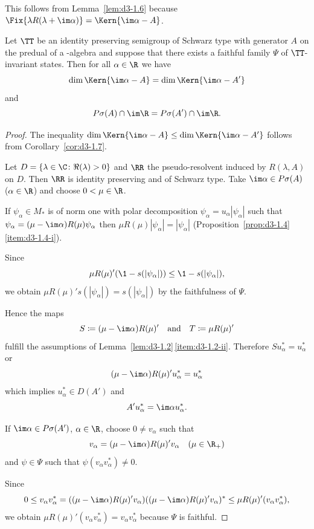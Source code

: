 This follows from Lemma~\ref{lem:d3-1.6} because $\Fix{\lambda R(\lambda+\im\alpha)} = \Kern{\im\alpha-A}$.
\begin{proposition}\label{prop:d3-1.8}
Let $\TT$ be an identity preserving semigroup of Schwarz type with generator $A$ on the predual of a \WA-algebra and suppose that there exists a faithful family $\Psi$ of\/ $\TT$-invariant states.
Then for all $\alpha \in \R$ we have
\[
\dim \Kern{\im\alpha - A} = \dim \Kern{\im\alpha - A'}
\]
and
\[
P\sigma(A) \cap \im\R = P{\sigma}(A') \cap \im\R .
\]
\end{proposition}
\begin{proof}
The inequality $\dim \Kern{\im\alpha - A} \leq \dim \Kern{\im\alpha - A'}$ follows from Corollary~\ref{cor:d3-1.7}.

Let $D = \{\lambda \in \C \colon \Re(\lambda) > 0\}$ and $\RR$ the pseudo-resolvent induced by $R(\lambda,A)$ on $D$.
Then $\RR$ is identity preserving and of Schwarz type.
Take $\im\alpha \in P\sigma(A)$ ($\alpha \in \R$) and choose $0 < \mu \in \R$.

If\/ $\psi_{\alpha} \in M_{*}$ is of norm one with polar decomposition $\psi_{\alpha} = u_{\alpha}|\psi_{\alpha}|$ such that $\psi_{\alpha} = (\mu - \im\alpha)R(\mu)\psi_{\alpha}$ then $\mu R(\mu)|\psi_{\alpha}| = |\psi_{\alpha}|$ (Proposition~\ref{prop:d3-1.4}\,\ref{item:d3-1.4-i}).

Since
\[
\mu R(\mu)'(\1 - s(|\psi_{\alpha}|)) 
    \leq \1 - s(|\psi_{\alpha}|) ,
\]
we obtain $\mu R(\mu)'s(|\psi_{\alpha}|) = s(|\psi_{\alpha}|)$ by the faithfulness of\/ $\Psi$.

Hence the maps 
\[
S \coloneqq (\mu - \im\alpha)R(\mu)'  
\quad \text{and} \quad 
T \coloneqq \mu R(\mu)'
\]
fulfill the assumptions of Lemma~\ref{lem:d3-1.2}\,\ref{item:d3-1.2-ii}.
Therefore $Su_{\alpha}^{*} = u_{\alpha}^{*}$ or 
\[
(\mu-\im\alpha)R(\mu)'u_{\alpha}^{*} = u_{\alpha}^{*}
\]
which implies $u_{\alpha}^{*} \in D(A')$ and 
\[
A'u_{\alpha}^{*} = \im\alpha u_{\alpha}^{*}.
\]

If\/ $\im\alpha \in P{\sigma}(A')$, $\alpha \in \R$, choose $0 \neq v_{\alpha}$ such that
\[
v_{\alpha} = (\mu - \im\alpha)R(\mu)'v_{\alpha} \quad (\mu \in \R_{+})
\]
and $\psi \in \Psi$ such that $\psi(v_{\alpha}v_{\alpha}^{*}) \neq 0$.

Since
\[
0 \leq v_{\alpha}v_{\alpha}^{*} = ((\mu - \im\alpha)R(\mu)'v_{\alpha})((\mu - \im\alpha)R(\mu)'v_{\alpha})^{*} \leq \mu R(\mu)'(v_{\alpha}v_{\alpha}^{*}) ,
\]
we obtain $\mu R(\mu)'(v_{\alpha}v_{\alpha}^{*}) = v_{\alpha}v_{\alpha}^{*}$ because $\Psi$ is faithful.


\end{proof}
